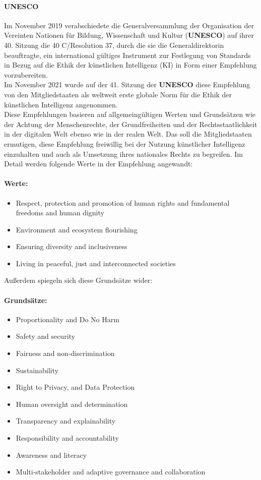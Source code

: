 \documentclass[12pt]{report}
\begin{document}
\paragraph{UNESCO\cite{UNESCO}\\}
Im November 2019 verabschiedete die Generalversammlung der Organisation der Vereinten Nationen für Bildung, Wissenschaft und Kultur (\textbf{UNESCO}) auf ihrer 40. Sitzung die 40 C/Resolution 37, durch die sie die Generaldirektorin beauftragte, \glqq ein international gültiges Instrument zur Festlegung von Standards in Bezug auf die Ethik der künstlichen Intelligenz (KI) in Form einer Empfehlung vorzubereiten\glqq{}.\\Im November 2021 wurde auf der 41. Sitzung der \textbf{UNESCO} diese Empfehlung von den Mitgliedstaaten als weltweit erste globale Norm für die Ethik der künstlichen Intelligenz angenommen.\\

Diese Empfehlungen basieren auf allgemeingültigen Werten und Grundsätzen wie der Achtung der Menschenrechte, der Grundfreiheiten und der Rechtsstaatlichkeit in der digitalen Welt ebenso wie in der realen Welt. Das soll die Mitgliedstaaten ermutigen, diese Empfehlung freiwillig bei der Nutzung künstlicher Intelligenz einzuhalten und auch als Umsetzung ihres nationales Rechts zu begreifen. Im Detail werden folgende Werte in der Empfehlung angewandt:

\paragraph{Werte:}
\begin{itemize}
	\item Respect, protection and promotion of human rights and fundamental freedoms and human dignity
	\item Environment and ecosystem flourishing
	\item Ensuring diversity and inclusiveness
	\item Living in peaceful, just and interconnected societies
\end{itemize}

Außerdem spiegeln sich diese Grundsätze wider:

\paragraph{Grundsätze:}
\begin{itemize}
	\item  Proportionality and Do No Harm
	\item  Safety and security
	\item  Fairness and non-discrimination
	\item  Sustainability
	\item  Right to Privacy, and Data Protection
	\item  Human oversight and determination
	\item  Transparency and explainability
	\item  Responsibility and accountability
	\item  Awareness and literacy
	\item  Multi-stakeholder and adaptive governance and collaboration
\end{itemize}
\end{document}
